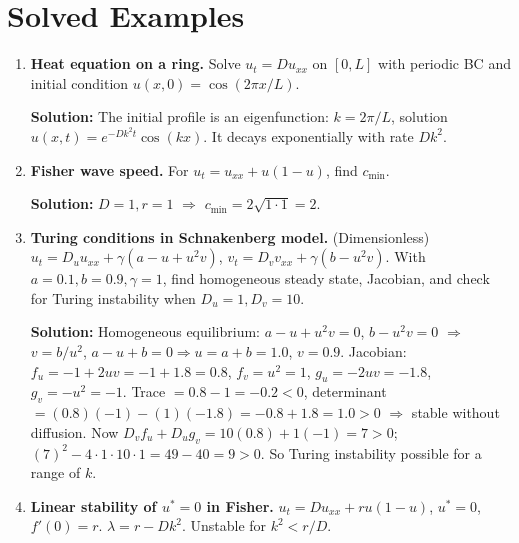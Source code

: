 \documentclass[12pt,a4paper]{book}
\begin{document}
\section{Solved Examples}
\begin{enumerate}[leftmargin=*, label=\textbf{Example 4.\arabic*}]
    \item \textbf{Heat equation on a ring.}
    Solve $u_t = D u_{xx}$ on $[0,L]$ with periodic BC and initial condition $u(x,0) = \cos(2\pi x/L)$.

    \textbf{Solution:} The initial profile is an eigenfunction: $k = 2\pi/L$, solution $u(x,t) = e^{-D k^2 t} \cos(k x)$. It decays exponentially with rate $D k^2$.

    \item \textbf{Fisher wave speed.}
    For $u_t = u_{xx} + u(1-u)$, find $c_{\min}$.

    \textbf{Solution:} $D=1, r=1$ $\Rightarrow$ $c_{\min} = 2\sqrt{1\cdot1} = 2$.

    \item \textbf{Turing conditions in Schnakenberg model.}
    (Dimensionless) $u_t = D_u u_{xx} + \gamma(a - u + u^2 v)$, $v_t = D_v v_{xx} + \gamma(b - u^2 v)$.
    With $a=0.1, b=0.9, \gamma=1$, find homogeneous steady state, Jacobian, and check for Turing instability when $D_u=1, D_v=10$.

    \textbf{Solution:} Homogeneous equilibrium: $a - u + u^2 v = 0$, $b - u^2 v = 0$ $\Rightarrow$ $v = b/u^2$, $a - u + b = 0 \Rightarrow u = a+b = 1.0$, $v = 0.9$.
    Jacobian: $f_u = -1 + 2u v = -1 + 1.8 = 0.8$, $f_v = u^2 = 1$, $g_u = -2u v = -1.8$, $g_v = -u^2 = -1$.
    Trace $= 0.8 - 1 = -0.2 < 0$, determinant $= (0.8)(-1) - (1)(-1.8) = -0.8+1.8 = 1.0 > 0$ $\Rightarrow$ stable without diffusion.
    Now $D_v f_u + D_u g_v = 10(0.8) + 1(-1) = 7 > 0$; $(7)^2 - 4\cdot1\cdot10\cdot1 = 49 - 40 = 9 > 0$. So Turing instability possible for a range of $k$.

    \item \textbf{Linear stability of $u^*=0$ in Fisher.}
    $u_t = D u_{xx} + r u(1-u)$, $u^*=0$, $f'(0)=r$. $\lambda = r - D k^2$. Unstable for $k^2 < r/D$.
\end{enumerate}
\end{document}

